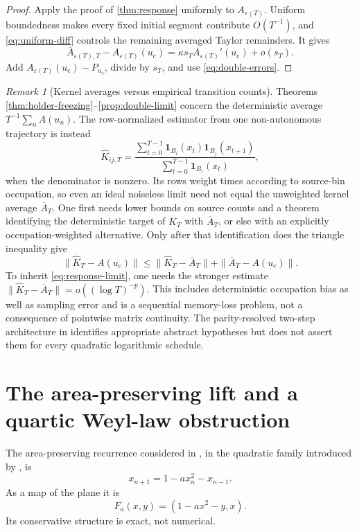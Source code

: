 \documentclass[11pt]{article}
\theoremstyle{definition}
\theoremstyle{remark}
\newtheorem{remark}[theorem]{Remark}
\newcommand{\uc}{u_{\mathrm c}}
\begin{document}
\begin{proof}
Apply the proof of \cref{thm:response} uniformly to $A_{\varepsilon(T)}$.  Uniform boundedness makes every fixed initial segment contribute $O(T^{-1})$, and \eqref{eq:uniform-diff} controls the remaining averaged Taylor remainders.  It gives
\[
    \overline A_{\varepsilon(T),T}-A_{\varepsilon(T)}(\uc)
    =\kappa s_T A_{\varepsilon(T)}'(\uc)+o(s_T).
\]
Add $A_{\varepsilon(T)}(\uc)-P_{\uc}$, divide by $s_T$, and use \eqref{eq:double-errors}.
\end{proof}

\begin{remark}[Kernel averages versus empirical transition counts]\label{rem:empirical}
Theorems \ref{thm:holder-freezing}--\ref{prop:double-limit} concern the deterministic average $T^{-1}\sum_n A(u_n)$.  The row-normalized estimator from one non-autonomous trajectory is instead
\[
    \widehat K_{ij,T}
    =\frac{\sum_{t=0}^{T-1}
      \mathbf1_{B_i}(x_t)\mathbf1_{B_j}(x_{t+1})}
    {\sum_{t=0}^{T-1}\mathbf1_{B_i}(x_t)},
\]
when the denominator is nonzero.  Its rows weight times according to source-bin occupation, so even an ideal noiseless limit need not equal the unweighted kernel average $\overline A_T$.  One first needs lower bounds on source counts and a theorem identifying the deterministic target of $\widehat K_T$ with $\overline A_T$, or else with an explicitly occupation-weighted alternative.  Only after that identification does the triangle inequality give
\[
    \|\widehat K_T-A(\uc)\|
    \le \|\widehat K_T-\overline A_T\|
       +\|\overline A_T-A(\uc)\|.
\]
To inherit \eqref{eq:response-limit}, one needs the stronger estimate
$\|\widehat K_T-\overline A_T\|=o((\log T)^{-p})$.  This includes deterministic occupation bias as well as sampling error and is a sequential memory-loss problem, not a consequence of pointwise matrix continuity.  The parity-resolved two-step architecture in \citet{WangParity2026} identifies appropriate abstract hypotheses but does not assert them for every quadratic logarithmic schedule.
\end{remark}

\section{The area-preserving lift and a quartic Weyl-law obstruction}\label{sec:weyl}

The area-preserving recurrence considered in \citet{WangHenon2026}, in the quadratic family introduced by \citet{Henon1969}, is
\begin{equation}\label{eq:henon-recurrence}
    x_{n+1}=1-a x_n^2-x_{n-1}.
\end{equation}
As a map of the plane it is
\begin{equation}\label{eq:henon-map}
    F_a(x,y)=(1-a x^2-y,x).
\end{equation}
Its conservative structure is exact, not numerical.
\end{document}
